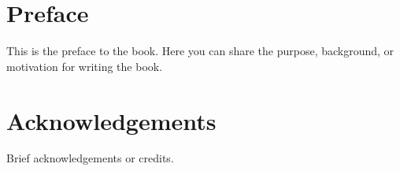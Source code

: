 \cleardoublepage
\thispagestyle{empty}
\tableofcontents
\section*{Preface}
This is the preface to the book. 
Here you can share the purpose, background, or motivation for writing the book.
\lipsum[2] %
\section*{Acknowledgements}
Brief acknowledgements or credits.
\lipsum[2] %